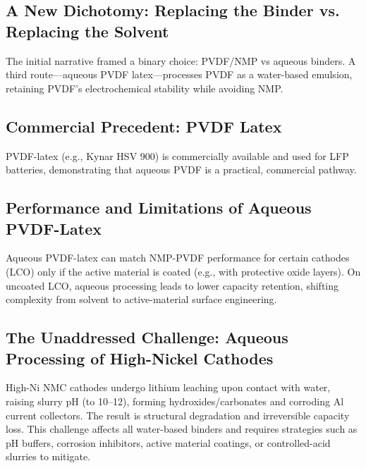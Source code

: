 \documentclass[12pt,a4paper]{article}
\begin{document}
\subsection{A New Dichotomy: Replacing the Binder vs. Replacing the Solvent}

The initial narrative framed a binary choice: PVDF/NMP vs aqueous binders. A third route—aqueous PVDF latex—processes PVDF as a water-based emulsion, retaining PVDF's electrochemical stability while avoiding NMP.\citep{ref5}

\subsection{Commercial Precedent: PVDF Latex}

PVDF-latex (e.g., Kynar HSV 900) is commercially available and used for LFP batteries, demonstrating that aqueous PVDF is a practical, commercial pathway.\citep{ref9}

\subsection{Performance and Limitations of Aqueous PVDF-Latex}

Aqueous PVDF-latex can match NMP-PVDF performance for certain cathodes (LCO) only if the active material is coated (e.g., with protective oxide layers). On uncoated LCO, aqueous processing leads to lower capacity retention, shifting complexity from solvent to active-material surface engineering.\citep{ref5}

\subsection{The Unaddressed Challenge: Aqueous Processing of High-Nickel Cathodes}

High-Ni NMC cathodes undergo lithium leaching upon contact with water, raising slurry pH (to 10--12), forming hydroxides/carbonates and corroding Al current collectors. The result is structural degradation and irreversible capacity loss. This challenge affects all water-based binders and requires strategies such as pH buffers, corrosion inhibitors, active material coatings, or controlled-acid slurries to mitigate.\citep{ref13}
\end{document}
